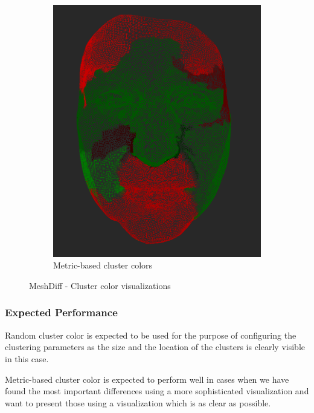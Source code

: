 \begin{figure}[h]
\begin{subfigure}{0.3\textwidth}
	\includegraphics[width=\textwidth]{./img/meshdiff-clustercolor-metric.PNG}
    \caption{Metric-based cluster colors}
    \label{fig:meshdiff_clustercolor_metric}
	\end{subfigure}
    
\caption[MeshDiff - Cluster color visualizations]{MeshDiff - Cluster color visualizations}
\end{figure}

\subsubsection{Expected Performance}

Random cluster color is expected to be used for the purpose of configuring the clustering parameters as the size and the location of the clusters is clearly visible in this case.

Metric-based cluster color is expected to perform well in cases when we have found the most important differences using a more sophisticated visualization and want to present those using a visualization which is as clear as possible.
